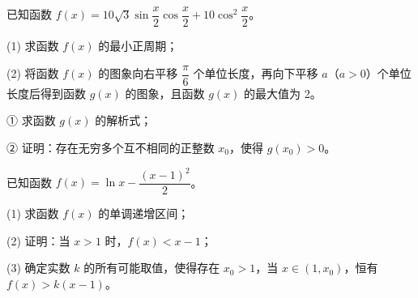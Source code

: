 \begin{question}

已知函数 \(f(x)=10\sqrt3\sin\dfrac{x}{2}\cos\dfrac{x}{2}+10\cos^2\dfrac{x}{2}\)。

(1) 求函数 \(f(x)\) 的最小正周期；

(2) 将函数 \(f(x)\) 的图象向右平移 \(\dfrac\pi6\) 个单位长度，再向下平移 \(a\)（\(a>0\)）个单位长度后得到函数 \(g(x)\) 的图象，且函数 \(g(x)\) 的最大值为 2。

① 求函数 \(g(x)\) 的解析式；

② 证明：存在无穷多个互不相同的正整数 \(x_0\)，使得 \(g(x_0)>0\)。

\end{question}
\begin{question}

已知函数 \(f(x)=\ln x-\dfrac{(x-1)^2}{2}\)。

(1) 求函数 \(f(x)\) 的单调递增区间；

(2) 证明：当 \(x>1\) 时，\(f(x)<x-1\)；

(3) 确定实数 \(k\) 的所有可能取值，使得存在 \(x_0>1\)，当 \(x\in(1,x_0)\)，恒有 \(f(x)>k(x-1)\)。

\end{question}